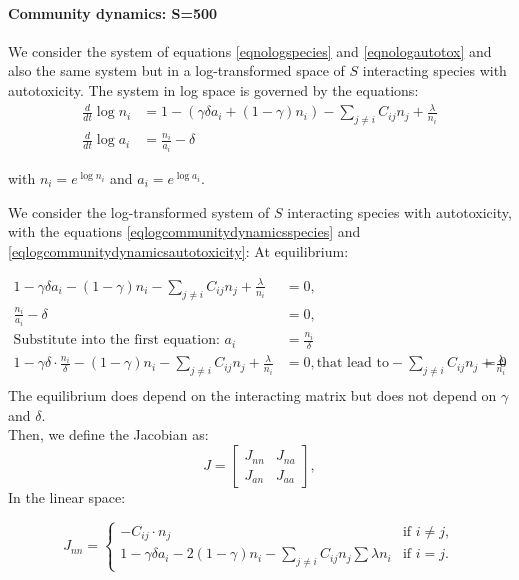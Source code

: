 \documentclass[11pt,a4paper,fleqn]{scrartcl}
\begin{document}
\paragraph{Community dynamics: S=500}
We consider the system of equations \ref{eqnologspecies} and \ref{eqnologautotox} and also the same system but in a log-transformed space of $S$ interacting species with autotoxicity.
The system in log space is governed by the equations:
\begin{align}
\label{eqlogcommunitydynamicsspecies}
\frac{d}{dt} \log n_i &= 1 - \left( \gamma \delta a_i + (1 - \gamma) n_i \right) - \sum_{j \ne i} C_{ij} n_j + \frac{\lambda}{n_i} \\
\label{eqlogcommunitydynamicsautotoxicity}
\frac{d}{dt} \log a_i &= \frac{n_i}{a_i} - \delta
\end{align}

with $n_i = e^{\log n_i}$ and $a_i = e^{\log a_i}$.

We consider the log-transformed system of $S$ interacting species with autotoxicity, with the equations \ref{eqlogcommunitydynamicsspecies} and \ref{eqlogcommunitydynamicsautotoxicity}:
At equilibrium:

\[
\begin{aligned}
1 - \gamma \delta a_i - (1 - \gamma) n_i - \sum_{j \ne i} C_{ij} n_j + \frac{\lambda}{n_i} &= 0, \\
\frac{n_i}{a_i} - \delta &= 0, \\
\text{Substitute into the first equation: } 
a_i &= \frac{n_i}{\delta}\\
1 - \gamma \delta \cdot \frac{n_i}{\delta} - (1 - \gamma) n_i - \sum_{j \ne i} C_{ij} n_j + \frac{\lambda}{n_i} &= 0, \text{that lead to}
- \sum_{j \ne i} C_{ij} n_j + \frac{\lambda}{n_i} &= 0 \\
\end{aligned}
\]
The equilibrium does depend on the interacting matrix but does not depend on $\gamma$ and $\delta$.\\
Then, we define the Jacobian as:
\[
J =
\begin{bmatrix}
J_{nn} & J_{na} \\
J_{an} & J_{aa}
\end{bmatrix},
\]
In the linear space:

\[
J_{nn} =
\begin{cases}
- C_{ij} \cdot n_j & \text{if } i \ne j, \\
1 - \gamma \delta a_i - 2(1-\gamma) n_i - \sum_{j \ne i} C_{ij} n_j \sum \lambda n_i & \text{if } i = j.
\end{cases}
\]
\end{document}
